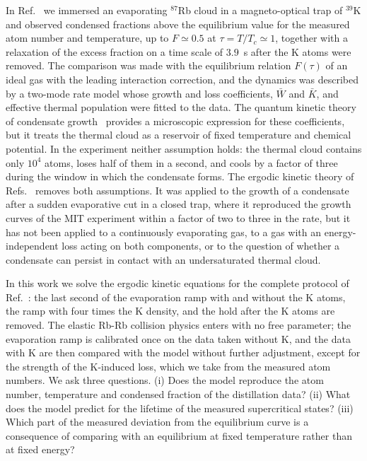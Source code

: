 In Ref.~\cite{MelladoMunoz2020} we immersed an evaporating $^{87}$Rb cloud in a
magneto-optical trap of $^{39}$K and observed condensed fractions above the
equilibrium value for the measured atom number and temperature, up to
$F\simeq0.5$ at $\tau=T/T_c\simeq1$, together with a relaxation of the excess
fraction on a time scale of $3.9$~s after the K atoms were removed. The
comparison was made with the equilibrium relation $F(\tau)$ of an ideal gas
with the leading interaction correction, and the dynamics was described by a
two-mode rate model whose growth and loss coefficients, $\bar W$ and $\bar K$,
and effective thermal population were fitted to the data. The quantum kinetic
theory of condensate growth~\cite{Gardiner1997,Gardiner1998} provides a
microscopic expression for these coefficients, but it treats the thermal cloud
as a reservoir of fixed temperature and chemical potential. In the experiment
neither assumption holds: the thermal cloud contains only $10^4$ atoms, loses
half of them in a second, and cools by a factor of three during the window in
which the condensate forms. The ergodic kinetic theory of
Refs.~\cite{Zaremba1999,Bijlsma2000} removes both assumptions. It was applied to
the growth of a condensate after a sudden evaporative cut in a closed trap,
where it reproduced the growth curves of the MIT experiment within a factor of
two to three in the rate, but it has not been applied to a continuously
evaporating gas, to a gas with an energy-independent loss acting on both
components, or to the question of whether a condensate can persist in contact
with an undersaturated thermal cloud.

In this work we solve the ergodic kinetic equations for the complete protocol
of Ref.~\cite{MelladoMunoz2020}: the last second of the evaporation ramp with
and without the K atoms, the ramp with four times the K density, and the hold
after the K atoms are removed. The elastic Rb-Rb collision physics enters with
no free parameter; the evaporation ramp is calibrated once on the data taken
without K, and the data with K are then compared with the model without further
adjustment, except for the strength of the K-induced loss, which we take from
the measured atom numbers. We ask three questions. (i) Does the model
reproduce the atom number, temperature and condensed fraction of the
distillation data? (ii) What does the model predict for the lifetime of the
measured supercritical states? (iii) Which part of the measured deviation from
the equilibrium curve is a consequence of comparing with an equilibrium at
fixed temperature rather than at fixed energy?
